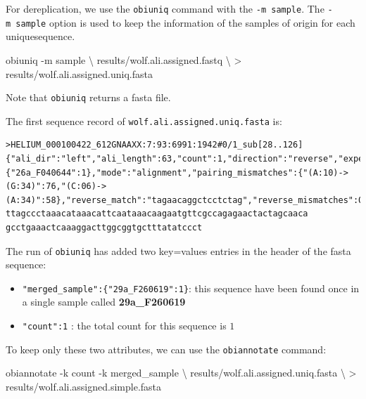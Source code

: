 \documentclass[
  letterpaper,
  DIV=11,
  numbers=noendperiod]{scrreprt}
\newenvironment{Shaded}{\begin{snugshade}}{\end{snugshade}}
\newcommand{\AttributeTok}[1]{\textcolor[rgb]{0.40,0.45,0.13}{#1}}
\newcommand{\DataTypeTok}[1]{\textcolor[rgb]{0.68,0.00,0.00}{#1}}
\newcommand{\ExtensionTok}[1]{\textcolor[rgb]{0.00,0.23,0.31}{#1}}
\newcommand{\NormalTok}[1]{\textcolor[rgb]{0.00,0.23,0.31}{#1}}
\newcommand{\OperatorTok}[1]{\textcolor[rgb]{0.37,0.37,0.37}{#1}}
\providecommand{\tightlist}{%
  \setlength{\itemsep}{0pt}\setlength{\parskip}{0pt}}\usepackage{longtable,booktabs,array}
\begin{document}
For dereplication, we use the \texttt{obiuniq} command with the
\texttt{-m\ sample}. The \texttt{-m\ sample} option is used to keep the
information of the samples of origin for each uniquesequence.

\begin{Shaded}
\begin{Highlighting}[]
\ExtensionTok{obiuniq} \AttributeTok{{-}m}\NormalTok{ sample }\DataTypeTok{\textbackslash{}}
\NormalTok{        results/wolf.ali.assigned.fastq }\DataTypeTok{\textbackslash{}}
        \OperatorTok{\textgreater{}}\NormalTok{ results/wolf.ali.assigned.uniq.fasta}
\end{Highlighting}
\end{Shaded}

Note that \texttt{obiuniq} returns a fasta file.

The first sequence record of \texttt{wolf.ali.assigned.uniq.fasta} is:

\begin{verbatim}
>HELIUM_000100422_612GNAAXX:7:93:6991:1942#0/1_sub[28..126] {"ali_dir":"left","ali_length":63,"count":1,"direction":"reverse","experiment":"wolf_diet","forward_match":"ttagataccccactatgc","forward_mismatches":0,"forward_primer":"ttagataccccactatgc","forward_tag":"gaatatc","merged_sample":{"26a_F040644":1},"mode":"alignment","pairing_mismatches":{"(A:10)->(G:34)":76,"(C:06)->(A:34)":58},"reverse_match":"tagaacaggctcctctag","reverse_mismatches":0,"reverse_primer":"tagaacaggctcctctag","reverse_tag":"gaatatc","score":730,"score_norm":0.968,"seq_a_single":45,"seq_ab_match":61,"seq_b_single":45}
ttagccctaaacataaacattcaataaacaagaatgttcgccagagaactactagcaaca
gcctgaaactcaaaggacttggcggtgctttatatccct
\end{verbatim}

The run of \texttt{obiuniq} has added two key=values entries in the
header of the fasta sequence:

\begin{itemize}
\tightlist
\item
  \texttt{"merged\_sample":\{"29a\_F260619":1\}}: this sequence have
  been found once in a single sample called \textbf{29a\_F260619}
\item
  \texttt{"count":1} : the total count for this sequence is \(1\)
\end{itemize}

To keep only these two attributes, we can use the \texttt{obiannotate}
command:

\begin{Shaded}
\begin{Highlighting}[]
\ExtensionTok{obiannotate} \AttributeTok{{-}k}\NormalTok{ count }\AttributeTok{{-}k}\NormalTok{ merged\_sample }\DataTypeTok{\textbackslash{}}
\NormalTok{  results/wolf.ali.assigned.uniq.fasta }\DataTypeTok{\textbackslash{}}
  \OperatorTok{\textgreater{}}\NormalTok{ results/wolf.ali.assigned.simple.fasta}
\end{Highlighting}
\end{Shaded}
\end{document}
